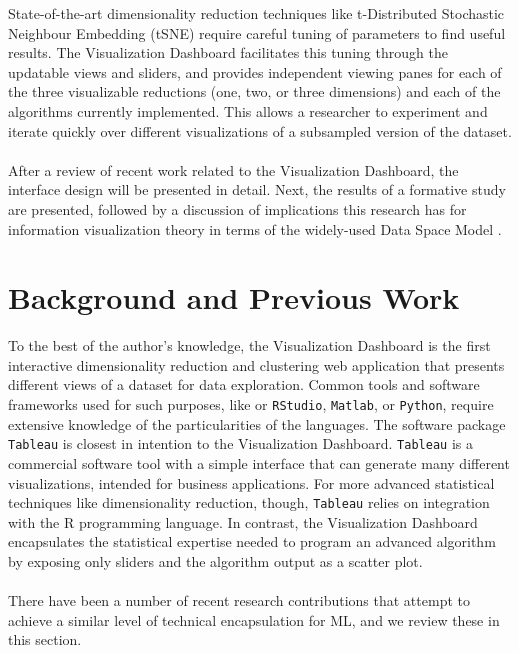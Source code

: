 \documentclass{sigchi}
\begin{document}
%
State-of-the-art dimensionality reduction techniques like t-Distributed Stochastic Neighbour Embedding (tSNE) \cite{maaten2008visualizing} require careful tuning of parameters to find useful results. %
%
The Visualization Dashboard facilitates this tuning through the updatable views and sliders, and provides independent viewing panes for each of the three visualizable reductions (one, two, or three dimensions) and each of the algorithms currently implemented. %
%
This allows a researcher to experiment and iterate quickly over different visualizations of a subsampled version of the dataset.%
%
\\\\
%
After a review of recent work related to the Visualization Dashboard, the interface design will be presented in detail. Next, the results of a formative study are presented, followed by a discussion of implications this research has for information visualization theory in terms of the widely-used Data Space Model \cite{chi1999framework}.
%
%
%
\section{Background and Previous Work}
%
%
%
To the best of the author's knowledge, the Visualization Dashboard is the first interactive dimensionality reduction and clustering web application that presents different views of a dataset for data exploration. %
%
Common tools and software frameworks used for such purposes, like or \texttt{RStudio}, \texttt{Matlab}, or \texttt{Python}, require extensive knowledge of the particularities of the languages. %
%
The software package \texttt{Tableau} \cite{tableau} is closest in intention to the Visualization Dashboard. %
\texttt{Tableau} is a commercial software tool with a simple interface that can generate many different visualizations, intended for business applications. %
For more advanced statistical techniques like dimensionality reduction, though, \texttt{Tableau} relies on integration with the R programming language. %
%
In contrast, the Visualization Dashboard encapsulates the statistical expertise needed to program an advanced algorithm by exposing only sliders and the algorithm output as a scatter plot. %
%
\\\\
%
There have been a number of recent research contributions that attempt to achieve a similar level of technical encapsulation for ML, and we review these in this section. %
%
%
\end{document}
